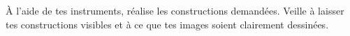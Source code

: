 %
%
À l'aide de tes instruments, réalise les constructions demandées.
    Veille à laisser tes constructions visibles et à ce que tes images
    soient clairement dessinées.
